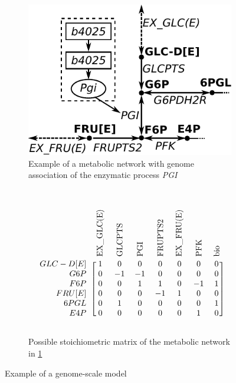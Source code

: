 \begin{figure}
\begin{subfigure}{.8\linewidth}
  \centering
  \includegraphics[width=.8\linewidth]{figures/GEM.pdf}
  \caption{Example of a metabolic network with genome association of the enzymatic process \textit{PGI}}
  \label{subfig:GEM_graph}
\end{subfigure}\\
\begin{subfigure}{.8\linewidth}
  \centering
  \begin{equation*}
  \begin{blockarray}{cccccccc}
  &
  \rotatebox{90}{EX\_GLC(E)} & 
  \rotatebox{90}{GLCPTS} & 
  \rotatebox{90}{PGI} & 
  \rotatebox{90}{FRUPTS2} & 
  \rotatebox{90}{EX\_FRU(E)} &
  \rotatebox{90}{PFK} &
  \rotatebox{90}{bio}\\
  \begin{block}{r[ccccccc]}
    GLC-D[E] &  1 &  0 &  0 &  0 &  0 &  0 &  0 \\
    G6P      &  0 & -1 & -1 &  0 &  0 &  0 &  0 \\
    F6P      &  0 &  0 &  1 &  1 &  0 & -1 &  1 \\
    FRU[E]   &  0 &  0 &  0 & -1 &  1 &  0 &  0 \\
    6PGL     &  0 &  1 &  0 &  0 &  0 &  0 &  1 \\
    E4P      &  0 &  0 &  0 &  0 &  0 &  1 &  0 \\
  \end{block}
  \end{blockarray}
  \end{equation*}
  \caption{Possible stoichiometric matrix of the metabolic network in \ref{subfig:GEM_graph}}
  \label{subfig:s_matrix_of_GEM_example}
\end{subfigure}
\caption{Example of a genome-scale model}
\label{fig:example_GEM}
\end{figure}
 



